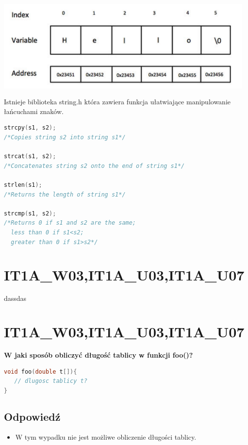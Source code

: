 \begin{center}
\includegraphics[width=13cm]{string_in_c}
\end{center}

Istnieje biblioteka string.h która zawiera funkcja ułatwiające manipulowanie łańcuchami znaków.
\begin{lstlisting}[language=c]
strcpy(s1, s2); 
/*Copies string s2 into string s1*/

strcat(s1, s2);
/*Concatenates string s2 onto the end of string s1*/

strlen(s1);
/*Returns the length of string s1*/

strcmp(s1, s2);
/*Returns 0 if s1 and s2 are the same;
  less than 0 if s1<s2;
  greater than 0 if s1>s2*/
\end{lstlisting}


\section{IT1A\_W03,IT1A\_U03,IT1A\_U07}dassdas


\section{IT1A\_W03,IT1A\_U03,IT1A\_U07} 
\textbf{W jaki sposób obliczyć długość tablicy w funkcji foo()?}
\begin{lstlisting}[language=c]
void foo(double t[]){
   // dlugosc tablicy t?
}
\end{lstlisting}

\subsection{Odpowiedź}
\begin{itemize}
\item W tym wypadku nie jest możliwe obliczenie długości tablicy.\\
\end{itemize}

